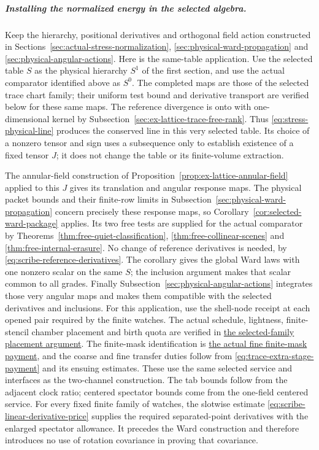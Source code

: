 \subparagraph{Installing the normalized energy in the selected algebra.}
Keep the hierarchy, positional derivatives and orthogonal field action
constructed in Sections~\ref{sec:actual-stress-normalization},
\ref{sec:physical-ward-propagation} and
\ref{sec:physical-angular-actions}. Here is the same-table application.
Use the selected table $S$ as the physical hierarchy $S^1$ of the first
section, and use the actual comparator identified above as $S^0$.
The completed maps are those of the selected trace chart family; their
uniform test bound and derivative transport are verified below for
these same maps. The reference divergence is onto with one-dimensional
kernel by Subsection~\ref{sec:ex-lattice-trace-free-rank}. Thus
\eqref{eq:stress-physical-line} produces the conserved line in this
very selected table. Its choice of a nonzero tensor and sign uses a
subsequence only to establish existence of a fixed tensor $J$; it
does not change the table or its finite-volume extraction.

The annular-field construction of
Proposition~\ref{prop:ex-lattice-annular-field} applied to this $J$
gives its translation and angular response maps. The physical packet
bounds and their finite-row limits in
Subsection~\ref{sec:physical-ward-propagation} concern precisely these
response maps, so Corollary~\ref{cor:selected-ward-package} applies.
Its two free tests are supplied for the actual comparator by
Theorems~\ref{thm:free-quiet-classification},
\ref{thm:free-collinear-scenes} and
\ref{thm:free-internal-erasure}. No change of reference derivatives is
needed, by \eqref{eq:scribe-reference-derivatives}. The corollary gives
the global Ward laws with one nonzero scalar on the same $S$; the
inclusion argument makes that scalar common to all grades. Finally
Subsection~\ref{sec:physical-angular-actions} integrates those very
angular maps and makes them compatible with the selected derivatives
and inclusions. For this application, use the shell-node receipt at each opened pair
required by the finite watches. The actual schedule, lightness,
finite-stencil chamber placement and birth quota are verified in
\hyperref[par:shell-actual-placement]{the selected-family placement
argument}. The finite-mask identification is
\hyperref[par:shell-actual-mask]{the actual fine finite-mask payment},
and the coarse and fine transfer duties follow from
\eqref{eq:trace-extra-stage-payment} and its ensuing estimates.
These use the same selected service and interfaces as the two-channel
construction. The tab bounds follow from the adjacent clock ratio;
centered spectator bounds come from the one-field centered service.
For every fixed finite family of watches, the slotwise estimate
\eqref{eq:scribe-linear-derivative-price} supplies the required
separated-point derivatives with the enlarged spectator allowance.
It precedes the Ward construction and therefore introduces no use of
rotation covariance in proving that covariance.

